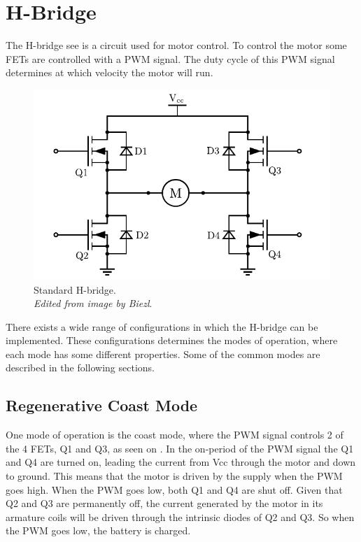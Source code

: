 
\section{H-Bridge}\label{sec:HBridge}
The H-bridge see  is a circuit used for motor control. To control the motor some FETs are controlled with a PWM signal. The duty cycle of this PWM signal determines at which velocity the motor will run.\cite{DCook}

\begin{figure}[H]
	\centering
	\includegraphics[scale=.6]{figures/Hbridge.pdf}
	\caption{Standard H-bridge.\\ \emph{Edited from image by Biezl}.\cite{Biezl}}
	\label{Hbridge}
\end{figure}\vspace{-5mm}

There exists a wide range of configurations in which the H-bridge can be implemented. These configurations determines the modes of operation, where each mode has some different properties. Some of the common modes are described in the following sections.\cite{DCook}

\subsection{Regenerative Coast Mode}
One mode of operation is the coast mode, where the PWM signal controls 2 of the 4 FETs, Q1 and Q3, as seen on . In the on-period of the PWM signal the Q1 and Q4 are turned on, leading the current from Vcc through the motor and down to ground. This means that the motor is driven by the supply when the PWM goes high. When the PWM goes low, both Q1 and Q4 are shut off. Given that Q2 and Q3 are permanently off, the current generated by the motor in its armature coils will be driven through the intrinsic diodes of Q2 and Q3. So when the PWM goes low, the battery is charged.\cite{PAndersen}

